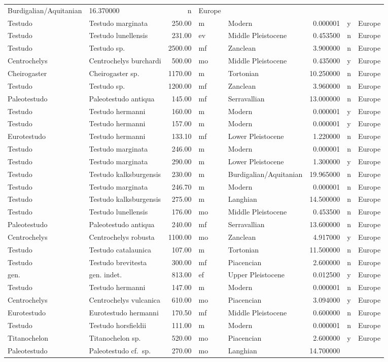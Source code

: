 \documentclass[]{article}
\begin{document}
\begin{longtable}[]{@{}llrllrll@{}}
Burdigalian/Aquitanian & 16.370000 & n & Europe\tabularnewline
Testudo & Testudo marginata & 250.00 & m & Modern & 0.000001 & y &
Europe\tabularnewline
Testudo & Testudo lunellensis & 231.00 & ev & Middle Pleistocene &
0.453500 & n & Europe\tabularnewline
Testudo & Testudo sp. & 2500.00 & mf & Zanclean & 3.900000 & n &
Europe\tabularnewline
Centrochelys & Centrochelys burchardi & 500.00 & mo & Middle Pleistocene
& 0.435000 & y & Europe\tabularnewline
Cheirogaster & Cheirogaster sp. & 1170.00 & m & Tortonian & 10.250000 &
n & Europe\tabularnewline
Testudo & Testudo sp. & 1200.00 & mf & Zanclean & 3.960000 & n &
Europe\tabularnewline
Paleotestudo & Paleotestudo antiqua & 145.00 & mf & Serravallian &
13.000000 & n & Europe\tabularnewline
Testudo & Testudo hermanni & 160.00 & m & Modern & 0.000001 & y &
Europe\tabularnewline
Testudo & Testudo hermanni & 157.00 & m & Modern & 0.000001 & y &
Europe\tabularnewline
Eurotestudo & Testudo hermanni & 133.10 & mf & Lower Pleistocene &
1.220000 & n & Europe\tabularnewline
Testudo & Testudo marginata & 246.00 & m & Modern & 0.000001 & n &
Europe\tabularnewline
Testudo & Testudo marginata & 290.00 & m & Lower Pleistocene & 1.300000
& y & Europe\tabularnewline
Testudo & Testudo kalksburgensis & 230.00 & m & Burdigalian/Aquitanian &
19.965000 & n & Europe\tabularnewline
Testudo & Testudo marginata & 246.70 & m & Modern & 0.000001 & n &
Europe\tabularnewline
Testudo & Testudo kalksburgensis & 275.00 & m & Langhian & 14.500000 & n
& Europe\tabularnewline
Testudo & Testudo lunellensis & 176.00 & mo & Middle Pleistocene &
0.453500 & n & Europe\tabularnewline
Paleotestudo & Paleotestudo antiqua & 240.00 & mf & Serravallian &
13.600000 & n & Europe\tabularnewline
Centrochelys & Centrochelys robusta & 1100.00 & mo & Zanclean & 4.917000
& y & Europe\tabularnewline
Testudo & Testudo catalaunica & 107.00 & m & Tortonian & 11.500000 & n &
Europe\tabularnewline
Testudo & Testudo brevitesta & 300.00 & mf & Piacencian & 2.600000 & n &
Europe\tabularnewline
gen. & gen. indet. & 813.00 & ef & Upper Pleistocene & 0.012500 & y &
Europe\tabularnewline
Testudo & Testudo hermanni & 147.00 & m & Modern & 0.000001 & n &
Europe\tabularnewline
Centrochelys & Centrochelys vulcanica & 610.00 & mo & Piacencian &
3.094000 & y & Europe\tabularnewline
Eurotestudo & Eurotestudo hermanni & 170.50 & mf & Middle Pleistocene &
0.600000 & n & Europe\tabularnewline
Testudo & Testudo horsfieldii & 111.00 & m & Modern & 0.000001 & n &
Europe\tabularnewline
Titanochelon & Titanochelon sp. & 520.00 & mo & Piacencian & 2.600000 &
y & Europe\tabularnewline
Paleotestudo & Paleotestudo cf.~sp. & 270.00 & mo & Langhian & 14.700000

\end{longtable}
\end{document}
